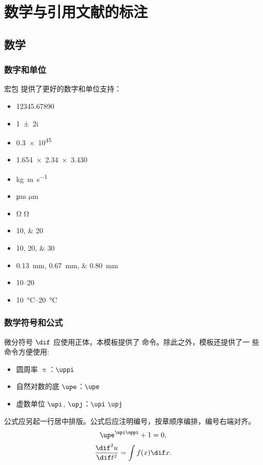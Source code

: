 
\chapter{数学与引用文献的标注}

\section{数学}

\subsection{数字和单位}

宏包  提供了更好的数字和单位支持：
\begin{itemize}
  \item \num{12345.67890}
  \item \num{1+-2i}
  \item \num{.3e45}
  \item \num{1.654 x 2.34 x 3.430}
  \item \si{kg.m.s^{-1}}
  \item \si{\micro\meter} $\si{\micro\meter}$
  \item \si{\ohm} $\si{\ohm}$
  \item \numlist{10;20}
  \item \numlist{10;20;30}
  \item \SIlist{0.13;0.67;0.80}{\milli\metre}
  \item \numrange{10}{20}
  \item \SIrange{10}{20}{\degreeCelsius}
\end{itemize}

\subsection{数学符号和公式}

微分符号 $\dif$ 应使用正体，本模板提供了  命令。除此之外，模板还提供了一
些命令方便使用:
\begin{itemize}
  \item 圆周率 $\uppi$：\verb|\uppi|
  \item 自然对数的底 $\upe$：\verb|\upe|
  \item 虚数单位 $\upi$, $\upj$：\verb|\upi| \verb|\upj|
\end{itemize}

公式应另起一行居中排版。公式后应注明编号，按章顺序编排，编号右端对齐。
\begin{equation}
  \upe^{\upi\uppi} + 1 = 0,
\end{equation}
\begin{equation}
  \frac{\dif^2 u}{\dif t^2} = \int f(x) \dif x.
\end{equation}

